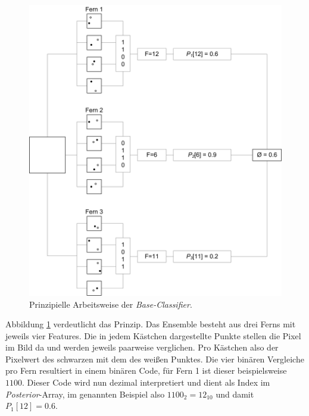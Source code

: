 	\begin{figure}[H]
	\begin{centering}
	\includegraphics[scale=0.5]{../pictures/EnsembleBeispiel.jpg}
	\par\end{centering}
	\caption{Prinzipielle Arbeitsweise der \textit{Base-Classifier}.}
	\label{EnCl}
	\end{figure}

	Abbildung \ref{EnCl} verdeutlicht das Prinzip. Das Ensemble besteht aus drei Ferns mit jeweils vier Features. Die in jedem Kästchen dargestellte Punkte stellen die Pixel im Bild da und werden jeweils paarweise verglichen. Pro Kästchen also der Pixelwert des schwarzen mit dem des weißen Punktes. Die vier binären Vergleiche pro Fern resultiert in einem binären Code, für Fern 1 ist dieser beispielsweise $1100$. Dieser Code wird nun dezimal interpretiert und dient als Index im\textit{ Posterior}-Array, im genannten Beispiel also $1100_{2}=12_{10}$ und damit $P_{1}[12]=0.6$.


